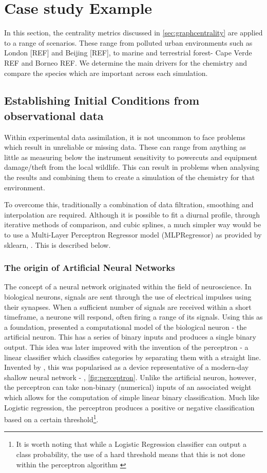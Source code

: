 
\section{Case study Example}\label{sec:metriccase}
In this section, the centrality metrics discussed in \autoref{sec:graphcentrality} are applied to a range of scenarios. These range from polluted urban environments such as London [REF] and Beijing [REF], to marine and terrestrial forest- Cape Verde REF and Borneo REF. We determine the main drivers for the chemistry and compare the species which are important across each simulation.  

\subsection{Establishing Initial Conditions from observational data}
Within experimental data assimilation, it is not uncommon to face problems which result in unreliable or missing data. These can range from anything as little as measuring below the instrument sensitivity to powercuts and equipment damage/theft from the local wildlife. This can result in problems when analysing the results and combining them to create a simulation of the chemistry for that environment. 

To overcome this, traditionally a combination of data filtration, smoothing and interpolation are required. Although it is possible to fit a diurnal profile, through iterative methods of comparison, and cubic splines, a much simpler way would be to use a Multi-Layer Perceptron Regressor model (MLPRegressor) as provided by sklearn, \citep{sklearn}. This is described below.

\subsubsection{The origin of Artificial Neural Networks}
The concept of a neural network originated within the field of neuroscience. In biological neurons, signals are sent through the use of electrical impulses using their synapses. When a sufficient number of signals are received within a short timeframe, a neurone will respond, often firing a range of its signals. Using this as a foundation,\cite{pitts} presented a computational model of the biological neuron - the artificial neuron. This has a series of binary inputs and produces a single binary output. This idea was later improved with the invention of the perceptron - a linear classifier which classifies categories by separating them with a straight line. Invented by \cite{perceptron}, this was popularised as a device representative of a modern-day shallow neural network - \citep{perceptronmanual}, \autoref{fig:perceptron}. Unlike the artificial neuron, however, the perceptron can take non-binary (numerical) inputs of an associated weight which allows for the computation of simple linear binary classification. Much like Logistic regression, the perceptron produces a positive or negative classification based on a certain threshold\footnote{It is worth noting that while a Logistic Regression classifier can output a class probability, the use of a hard threshold means that this is not done within the perceptron algorithm \citep{handsonml}}. 


